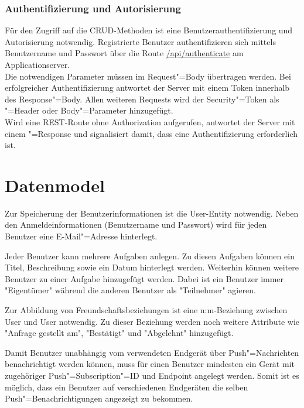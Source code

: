 \subsubsection{Authentifizierung und Autorisierung} 

Für den Zugriff auf die CRUD-Methoden ist eine Benutzerauthentifizierung und Autorisierung notwendig. Registrierte Benutzer authentifizieren sich mittels Benutzername und Passwort über die Route \url{/api/authenticate} am Applicationserver. \\
Die notwendigen Parameter müssen im Request"=Body übertragen werden. Bei erfolgreicher Authentifizierung antwortet der Server mit einem Token innerhalb des Response"=Body. Allen weiteren Requests wird der Security"=Token als "=Header oder Body"=Parameter hinzugefügt. \\
Wird eine REST-Route ohne Authorization aufgerufen, antwortet der Server mit einem "=Response und signalisiert damit, dass eine Authentifizierung erforderlich ist. 

\section{Datenmodel}
\label{sec_konzeption_datamodel}


Zur Speicherung der Benutzerinformationen ist die User-Entity notwendig. Neben den Anmeldeinformationen (Benutzername und Passwort) wird für jeden Benutzer eine E-Mail"=Adresse hinterlegt. 

Jeder Benutzer kann mehrere Aufgaben anlegen. Zu diesen Aufgaben können ein Titel, Beschreibung sowie ein Datum hinterlegt werden. Weiterhin können weitere Benutzer zu einer Aufgabe hinzugefügt werden. Dabei ist ein Benutzer immer "Eigentümer" während die anderen Benutzer als "Teilnehmer" agieren.

Zur Abbildung von Freundschaftsbeziehungen ist eine n:m-Beziehung zwischen User und User notwendig. Zu dieser Beziehung werden noch weitere Attribute wie "Anfrage gestellt am", "Bestätigt" und "Abgelehnt" hinzugefügt.

Damit Benutzer unabhängig vom verwendeten Endgerät über Push"=Nachrichten benachrichtigt werden können, muss für einen Benutzer mindesten ein Gerät mit zugehöriger Push"=Subscription"=ID und Endpoint angelegt werden. Somit ist es möglich, dass ein Benutzer auf verschiedenen Endgeräten die selben Push"=Benachrichtigungen angezeigt zu bekommen.

